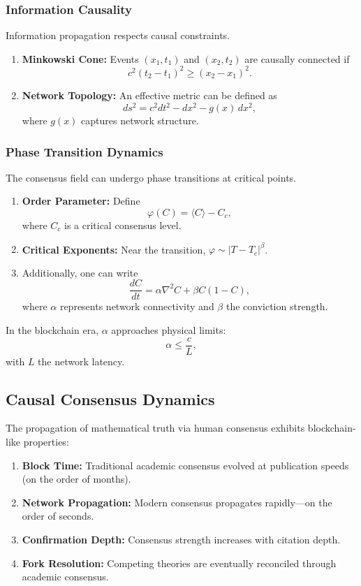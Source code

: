 \documentclass[11pt]{article}
\begin{document}
\subsubsection{Information Causality}

Information propagation respects causal constraints.
\begin{enumerate}[label=(\arabic*)]
    \item \textbf{Minkowski Cone:} Events $(x_1,t_1)$ and $(x_2,t_2)$ are causally connected if
    \[
    c^2(t_2-t_1)^2 \geq (x_2-x_1)^2.
    \]
    \item \textbf{Network Topology:} An effective metric can be defined as
    \[
    ds^2 = c^2dt^2 - dx^2 - g(x)\, dx^2,
    \]
    where $g(x)$ captures network structure.
\end{enumerate}

\subsubsection{Phase Transition Dynamics}

The consensus field can undergo phase transitions at critical points.
\begin{enumerate}[label=(\arabic*)]
    \item \textbf{Order Parameter:} Define 
    \[
    \varphi(C) = \langle C \rangle - C_c,
    \]
    where $C_c$ is a critical consensus level.
    \item \textbf{Critical Exponents:} Near the transition, $\varphi \sim |T-T_c|^\beta$.
    \item Additionally, one can write
    \[
    \frac{dC}{dt} = \alpha \nabla^2 C + \beta C (1-C),
    \]
    where $\alpha$ represents network connectivity and $\beta$ the conviction strength.
\end{enumerate}
In the blockchain era, $\alpha$ approaches physical limits:
\[
\alpha \leq \frac{c}{L},
\]
with $L$ the network latency.

\subsection{Causal Consensus Dynamics}

The propagation of mathematical truth via human consensus exhibits blockchain-like properties:
\begin{enumerate}[label=(\arabic*)]
    \item \textbf{Block Time:} Traditional academic consensus evolved at publication speeds (on the order of months).
    \item \textbf{Network Propagation:} Modern consensus propagates rapidly––on the order of seconds.
    \item \textbf{Confirmation Depth:} Consensus strength increases with citation depth.
    \item \textbf{Fork Resolution:} Competing theories are eventually reconciled through academic consensus.
\end{enumerate}
\end{document}
